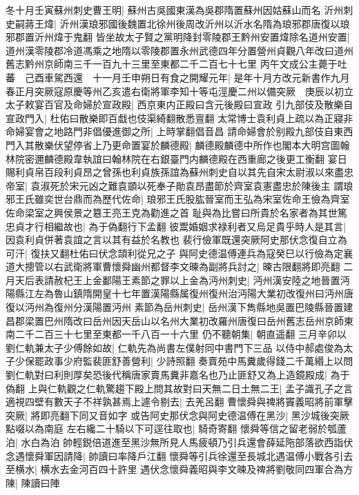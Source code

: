 冬十月壬寅蘇州刺史曹王明|{
	蘇州古吳國東漢為吳郡隋置蘇州因姑蘇山而名}
沂州刺史嗣蔣王煒|{
	沂州漢琅邪國後魏置北徐州後周改沂州以沂水名隋為琅邪郡唐復以琅邪郡置沂州煒于鬼翻}
皆坐故太子賢之黨明降封零陵郡王黔州安置煒除名道州安置|{
	道州漢零陵郡冷道馮乘之地隋以零陵郡置永州武德四年分置營州貞觀八年改曰道州舊志黔州京師南三千一百九十三里至東都二千二百七十七里}
丙午文成公主薨于吐蕃　己酉車駕西還　十一月壬申朔日有食之開耀元年|{
	是年十月方改元新書作九月}
春正月突厥寇原慶等州乙亥遣右衛將軍李知十等屯涇慶二州以備突厥　庚辰以初立太子敕宴百官及命婦於宣政殿|{
	西京東内正殿曰含元後殿曰宣政}
引九部伎及散樂自宣政門入|{
	杜佑曰散樂即百戱也伎渠綺翻散悉亶翻}
太常博士袁利貞上疏以為正寢非命婦宴會之地路門非倡優進御之所|{
	上時掌翻倡音昌}
請命婦會於别殿九部伎自東西門入其散樂伏望停省上乃更命置宴於麟德殿|{
	麟德殿麟德中所作也閣本大明宫圖翰林院密邇麟德殿韋執誼曰翰林院在右銀臺門内麟德殿在西重廊之後更工衡翻}
宴日賜利貞帛百段利貞昂之曾孫也利貞族孫誼為蘇州刺史自以其先自宋太尉淑以來盡忠帝室|{
	袁淑死於宋元凶之難袁顗以死奉子勛袁昂盡節於齊室袁憲盡忠於陳後主}
謂琅邪王氏雖奕世台鼎而為歷代佐命|{
	琅邪王氏股肱晉室而王弘為宋室佐命王儉為齊室佐命梁室之興侯景之簒王亮王克為勸進之首}
耻與為比嘗曰所貴於名家者為其世篤忠貞才行相繼故也|{
	為于偽翻行下孟翻}
彼鬻婚姻求禄利者又烏足貴乎時人是其言|{
	因袁利貞併著袁誼之言以其有益於名教也}
裴行儉軍既還突厥阿史那伏念復自立為可汗|{
	復扶又翻杜佑曰伏念頡利從兄之子}
與阿史德温傅連兵為寇癸巳以行儉為定襄道大摠管以右武衛將軍曹懷舜幽州都督李文暕為副將兵討之|{
	暕古限翻將即亮翻}
二月天后表請赦杞王上金鄱陽王素節之罪以上金為沔州刺史|{
	沔州漢安陸之地晉置沔陽縣江左為魯山鎮隋開皇十七年置漢陽縣属復州復州治沔陽大業初改復州曰沔州唐復以沔州為復州分漢陽置沔州}
素節為岳州刺史|{
	岳州漢下雋縣地吳置巴陵縣晉置建昌郡梁置巴州隋改曰岳州因天岳山以名州大業初改羅州唐復曰岳州舊志岳州京師東南二千二百三十七里至東都一千八百一十六里}
仍不聽朝集|{
	朝直遥翻}
三月辛卯以劉仁軌兼太子少傅餘如故|{
	仁軌先為尚書左僕射同中書門下三品}
以侍中郝處俊為太子少保罷政事少府監裴匪舒善營利|{
	少詩照翻}
奏賣苑中馬糞歲得錢二千萬緡上以問劉仁軌對曰利則厚矣恐後代稱唐家賣馬糞非嘉名也乃止匪舒又為上造鏡殿成|{
	為于偽翻}
上與仁軌觀之仁軌驚趨下殿上問其故對曰天無二日土無二王|{
	孟子識孔子之言}
適視四壁有數天子不祥孰甚焉上遽令剔去|{
	去羌呂翻}
曹懷舜與禆將竇義昭將前軍擊突厥|{
	將即亮翻下同又音如字}
或告阿史那伏念與阿史德温傅在黑沙|{
	黑沙城後突厥點啜以為南庭}
左右纔二十騎以下可逕往取也|{
	騎奇寄翻}
懷舜等信之留老弱於瓠蘆泊|{
	水白為泊}
帥輕鋭倍道進至黑沙無所見人馬疲頓乃引兵還會薛延陁部落欲西詣伏念遇懷舜軍因請降|{
	帥讀曰率降戶江翻}
懷舜等引兵徐還至長城北遇温傅小戰各引去至横水|{
	横水去金河百四十許里}
遇伏念懷舜義昭與李文暕及禆將劉敬同四軍合為方陳|{
	陳讀曰陣}
